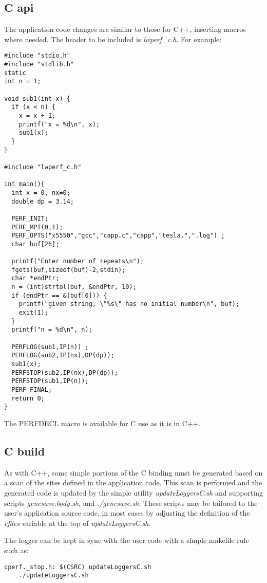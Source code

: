 \documentclass{article}
\begin{document}
\subsection{C api}
\label{sec:capi}
The application code changes are similar to those for C++, inserting macros where needed. The header to be included is {\em lwperf\_c.h}. For example:
\begin{verbatim}
#include "stdio.h"
#include "stdlib.h"
static
int n = 1;

void sub1(int x) {
  if (x < n) {
    x = x + 1;
    printf("x = %d\n", x);
    sub1(x);
  }
}

#include "lwperf_c.h"

int main(){
  int x = 0, nx=0;
  double dp = 3.14;

  PERF_INIT;
  PERF_MPI(0,1);
  PERF_OPTS("x5550","gcc","capp.c","capp","tesla.",".log") ;
  char buf[26];

  printf("Enter number of repeats\n");
  fgets(buf,sizeof(buf)-2,stdin);
  char *endPtr;
  n = (int)strtol(buf, &endPtr, 10);
  if (endPtr == &(buf[0])) {
    printf("given string, \"%s\" has no initial number\n", buf);
    exit(1);
  }
  printf("n = %d\n", n);

  PERFLOG(sub1,IP(n)) ;
  PERFLOG(sub2,IP(nx),DP(dp));
  sub1(x);
  PERFSTOP(sub2,IP(nx),DP(dp));
  PERFSTOP(sub1,IP(n));
  PERF_FINAL;
  return 0;
}
\end{verbatim}

The PERFDECL macro is available for C use as it is in C++.

\subsection{C build}
\label{sec:cbuild}
As with C++, some simple portions of the C binding must be generated based on a scan of the sites defined in the application code. This scan is performed and the generated code is updated by the simple utility {\em updateLoggersC.sh} and supporting scripts {\em gencsave.body.sh}, and {\em ./gencsave.sh}. These scripts may be tailored to the user's application source code, in most cases by adjusting the definition of the {\em cfiles} variable at the top of {\em updateLoggersC.sh}.

The logger can be kept in sync with the user code with a simple makefile rule such as:
\begin{verbatim}
cperf._stop.h: $(CSRC) updateLoggersC.sh
	./updateLoggersC.sh
\end{verbatim}
\end{document}

